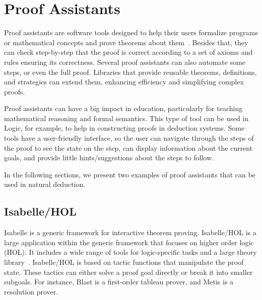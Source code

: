 
\section{Proof Assistants}
Proof assistants are software tools designed to help their users formalize programs or mathematical concepts and prove theorems about them~\cite{andersschlichtkrull_2015_formalization}. Besides that, they can check step-by-step that the proof is correct according to a set of axioms and rules ensuring its correctness. Several proof assistants can also automate some steps, or even the full proof. Libraries that provide reusable theorems, definitions, and strategies can extend them, enhancing efficiency and simplifying complex proofs.

Proof assistants can have a big impact in education, particularly for teaching mathematical reasoning and formal semantics. This type of tool can be used in Logic, for example, to help in constructing proofs in deduction systems. Some tools have a user-friendly interface, so the user can navigate through the steps of the proof to see the state on the step, can display information about the current goals, and provide little hints/suggestions about the steps to follow.

In the following sections, we present two examples of proof assistants that can be used in natural deduction.

\subsection{Isabelle/HOL}
Isabelle is a generic framework for interactive theorem proving. Isabelle/HOL is a large application within the generic framework that focuses on higher order logic (HOL). It includes a wide range of tools for logic-specific tasks and a large theory library~\cite{wenzel_the,blanchette_automatic}. Isabelle/HOL is based on tactic functions that manipulate the proof state. These tactics can either solve a proof goal directly or break it into smaller subgoals. For instance, Blast is a first-order tableau prover, and Metis is a resolution prover.

